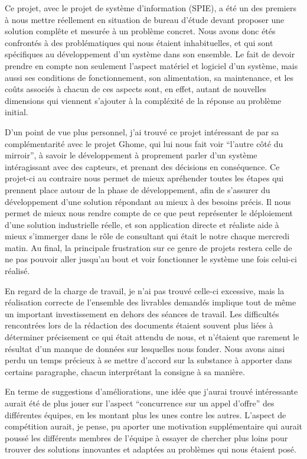 Ce projet, avec le projet de système d'information (SPIE), a été un des premiers à nous mettre réellement en situation de bureau d'étude devant proposer une solution complête et mesurée à un problème concret. Nous avons donc étés confrontés à des problématiques qui nous étaient inhabituelles, et qui sont spécifiques au développement d'un système dans son ensemble. Le fait de devoir prendre en compte non seulement l'aspect matériel et logiciel d'un système, mais aussi ses conditions de fonctionnement, son alimentation, sa maintenance, et les coûts associés à chacun de ces aspects sont, en effet, autant de nouvelles dimensions qui viennent s'ajouter à la compléxité de la réponse au problème initial.

D'un point de vue plus personnel, j'ai trouvé ce projet intéressant de par sa complémentarité avec le projet Ghome, qui lui nous fait voir ``l'autre côté du mirroir'', à savoir le développement à proprement parler d'un système intéragissant avec des capteurs, et prenant des décisions en conséquence. Ce projet-ci au contraire nous permet de mieux apréhender toutes les étapes qui prennent place autour de la phase de développement, afin de s'assurer du développement d'une solution répondant au mieux à des besoins précis. Il nous permet de mieux nous rendre compte de ce que peut représenter le déploiement d'une solution industrielle réelle, et son application directe et réaliste aide à mieux s'immerger dans le rôle de consultant qui était le notre chaque mercredi matin. Au final, la principale frustration sur ce genre de projets restera celle de ne pas pouvoir aller jusqu'au bout et voir fonctionner le système une fois celui-ci réalisé.

En regard de la charge de travail, je n'ai pas trouvé celle-ci excessive, mais la réalisation correcte de l'ensemble des livrables demandés implique tout de même un important investissement en dehors des séances de travail. Les difficultés rencontrées lors de la rédaction des documents étaient souvent plus liées à déterminer précisement ce qui était attendu de nous, et n'étaient que rarement le résultat d'un manque de données sur lesquelles nous fonder. Nous avons ainsi perdu un temps précieux à se mettre d'accord sur la substance à apporter dans certains paragraphe, chacun interprétant la consigne à sa manière.

En terme de suggestions d'améliorations, une idée que j'aurai trouvé intéressante aurait été de plus jouer sur l'aspect ``concurrence sur un appel d'offre'' des différentes équipes, en les montant plus les unes contre les autres. L'aspect de compétition aurait, je pense, pu aporter une motivation supplémentaire qui aurait poussé les différents membres de l'équipe à essayer de chercher plus loins pour trouver des solutions innovantes et adaptées au problèmes qui nous étaient posé.